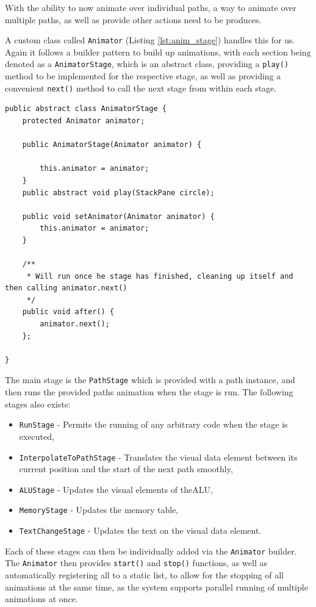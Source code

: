 With the ability to now animate over individual paths, a way to animate over multiple paths, as well as provide other actions need to be produces.

A custom class called \texttt{Animator} (Listing \ref{lst:anim_stage}) handles this for us. Again it follows a builder pattern to build up animations, with each section being denoted as a \texttt{AnimatorStage}, which is an abstract class, providing a \verb|play()| method to be implemented for the respective stage, as well as providing a convenient \verb|next()| method to call the next stage from within each stage.

\begin{lstlisting}[caption=Abstract \texttt{AnimatorStage} class, label=lst:anim_stage]
public abstract class AnimatorStage {
    protected Animator animator;

    public AnimatorStage(Animator animator) {

        this.animator = animator;
    }
    public abstract void play(StackPane circle);

    public void setAnimator(Animator animator) {
        this.animator = animator;
    }

    /**
     * Will run once he stage has finished, cleaning up itself and then calling animator.next()
     */
    public void after() {
        animator.next();
    };

}
\end{lstlisting}

The main stage is the \texttt{PathStage} which is provided with a path instance, and then runs the provided paths animation when the stage is run. The following stages also exists:

\begin{itemize}
    \item \texttt{RunStage} - Permits the running of any arbitrary code when the stage is executed,
    \item \texttt{InterpolateToPathStage} - Translates the visual data element between its current position and the start of the next path smoothly,
    \item \texttt{ALUStage} - Updates the visual elements of the\ac{ALU},
    \item \texttt{MemoryStage} - Updates the memory table,
    \item \texttt{TextChangeStage} - Updates the text on the visual data element.
\end{itemize}

Each of these stages can then be individually added via the \texttt{Animator} builder. The \texttt{Animator} then provides \verb|start()| and \verb|stop()| functions, as well as automatically registering all to a static list, to allow for the stopping of all animations at the same time, as the system supports parallel running of multiple animations at once.

